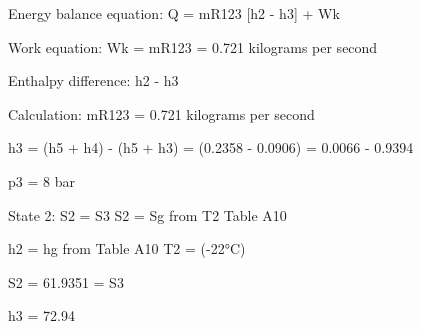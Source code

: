 Energy balance equation:  
Q = mR123 [h2 - h3] + Wk  

Work equation:  
Wk = mR123 = 0.721 kilograms per second  

Enthalpy difference:  
h2 - h3  

Calculation:  
mR123 = 0.721 kilograms per second  

h3 = (h5 + h4) - (h5 + h3)  
= (0.2358 - 0.0906)  
= 0.0066 - 0.9394  

p3 = 8 bar  

State 2:  
S2 = S3  
S2 = Sg from T2  
Table A10  

h2 = hg from Table A10  
T2 = (-22°C)  

S2 = 61.9351 = S3  

h3 = 72.94